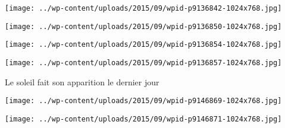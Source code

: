 \begin{center} \texttt{[image: ../wp-content/uploads/2015/09/wpid-p9136842-1024x768.jpg]} \end{center}

 

 

\begin{center} \texttt{[image: ../wp-content/uploads/2015/09/wpid-p9136850-1024x768.jpg]} \end{center}

 

 

\begin{center} \texttt{[image: ../wp-content/uploads/2015/09/wpid-p9136854-1024x768.jpg]} \end{center}

 

 

\begin{center} \texttt{[image: ../wp-content/uploads/2015/09/wpid-p9136857-1024x768.jpg]} \end{center}

 

 Le soleil fait son apparition le dernier jour 

 

\begin{center} \texttt{[image: ../wp-content/uploads/2015/09/wpid-p9146869-1024x768.jpg]} \end{center}

 

 

\begin{center} \texttt{[image: ../wp-content/uploads/2015/09/wpid-p9146871-1024x768.jpg]} \end{center}




 
 
